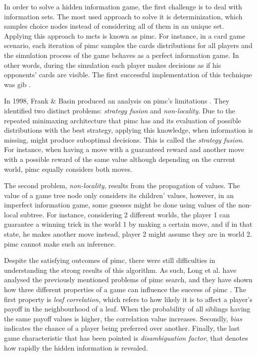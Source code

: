 In order to solve a hidden information game, the first challenge is to deal with information sets.
The most used approach to solve it is determinization, which samples choice nodes instead of considering all of them in an unique set.
Applying this approach to \ac{mcts} is known as \ac{pimc}.
For instance, in a card game scenario, each iteration of \ac{pimc} samples the cards distributions for all players and the simulation process of the game behaves as a perfect information game.
In other words, during the simulation each player makes decisions as if his opponents' cards are visible.
The first successful implementation of this technique was \ac{gib} \cite{Ginsberg2001}.


In 1998, Frank \& Basin produced an analysis on \ac{pimc}'s limitations \cite{Frank1998}.
They identified two distinct problems: \emph{strategy fusion} and \emph{non-locality}.
Due to the repeated minimaxing architecture that \ac{pimc} has and its evaluation of possible distributions with the best strategy, applying this knowledge, when information is missing, might produce suboptimal decisions.
This is called the \emph{strategy fusion}.
For instance, when having a move with a guaranteed reward and another move with a possible reward of the same value although depending on the current world, \ac{pimc} equally considers both moves.


The second problem, \emph{non-locality}, results from the propagation of values.
The value of a game tree node only considers its children' values, however, in an imperfect information game, some guesses might be done using values of the non-local subtree.
For instance, considering 2 different worlds, the player 1 can guarantee a winning trick in the world 1 by making a certain move, and if in that state, he makes another move instead, player 2 might assume they are in world 2.
\ac{pimc} cannot make such an inference.


Despite the satisfying outcomes of \ac{pimc}, there were still difficulties in understanding the strong results of this algorithm.
As such, Long et al. have analysed the previously mentioned problems of \ac{pimc} search, and they have shown how three different properties of a game can influence the success of \ac{pimc} \cite{Long2010}.
The first property is \emph{leaf correlation}, which refers to how likely it is to affect a player's payoff in the neighbourhood of a leaf.
When the probability of all siblings having the same payoff values is higher, the correlation value increases.
Secondly, \emph{bias} indicates the chance of a player being preferred over another.
Finally, the last game characteristic that has been pointed is \emph{disambiguation factor}, that denotes how rapidly the hidden information is revealed.


